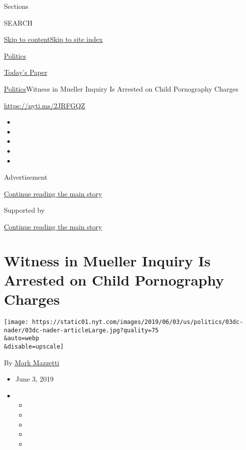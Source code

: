 Sections

SEARCH

\protect\hyperlink{site-content}{Skip to
content}\protect\hyperlink{site-index}{Skip to site index}

\href{https://www.nytimes.com/section/politics}{Politics}

\href{https://myaccount.nytimes.com/auth/login?response_type=cookie\&client_id=vi}{}

\href{https://www.nytimes.com/section/todayspaper}{Today's Paper}

\href{/section/politics}{Politics}\textbar{}Witness in Mueller Inquiry
Is Arrested on Child Pornography Charges

\url{https://nyti.ms/2JRFGQZ}

\begin{itemize}
\item
\item
\item
\item
\item
\end{itemize}

Advertisement

\protect\hyperlink{after-top}{Continue reading the main story}

Supported by

\protect\hyperlink{after-sponsor}{Continue reading the main story}

\hypertarget{witness-in-mueller-inquiry-is-arrested-on-child-pornography-charges}{%
\section{Witness in Mueller Inquiry Is Arrested on Child Pornography
Charges}\label{witness-in-mueller-inquiry-is-arrested-on-child-pornography-charges}}

\texttt{[image: https://static01.nyt.com/images/2019/06/03/us/politics/03dc-nader/03dc-nader-articleLarge.jpg?quality=75\\\&auto=webp\\\&disable=upscale]}

By \href{https://www.nytimes.com/by/mark-mazzetti}{Mark Mazzetti}

\begin{itemize}
\item
  June 3, 2019
\item
  \begin{itemize}
  \item
  \item
  \item
  \item
  \item
  \end{itemize}
\end{itemize}

